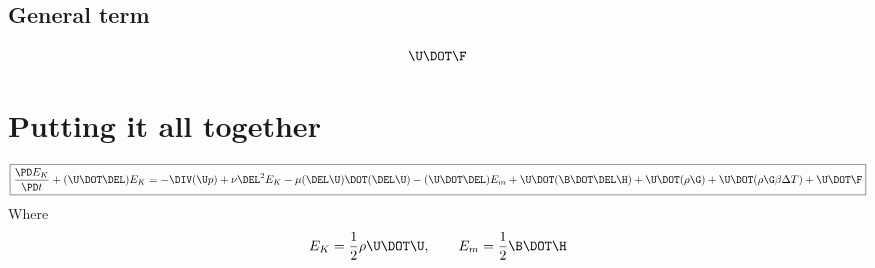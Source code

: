 \documentclass[11pt]{article}
\begin{document}
\subsection{General term}
\begin{equation}
	\U \DOT \F
\end{equation}

\section{Putting it all together}
\begin{equation}
	\boxed{
	\frac{\PD E_K}{\PD t} +
	(\U \DOT \DEL) E_K =
	- \DIV (\U p)
	+ \nu \DEL^2 E_K
	- \mu (\DEL \U) \DOT (\DEL \U)
	- (\U \DOT \DEL) E_m
	+ \U \DOT (\B \DOT \DEL \H)
	+ \U \DOT (\rho \G)
	+ \U \DOT (\rho \G \beta \Delta T)
	+ \U \DOT \F
	}
\end{equation}
Where
\begin{equation}
	E_K = \frac{1}{2} \rho \U \DOT \U, \qquad
	E_m = \frac{1}{2} \B \DOT \H
\end{equation}
\end{document}

